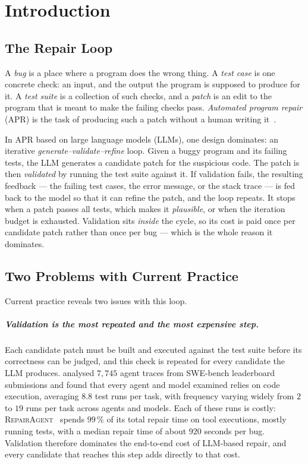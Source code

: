 \chapter{Introduction}
\label{ch:intro}

\section{The Repair Loop}
\label{sec:intro-loop}

A \emph{bug} is a place where a program does the wrong thing. A \emph{test case}
is one concrete check: an input, and the output the program is supposed to
produce for it. A \emph{test suite} is a collection of such checks, and a
\emph{patch} is an edit to the program that is meant to make the failing checks
pass. \emph{Automated program repair} (APR) is the task of producing such a
patch without a human writing it~\citep{legoues2019apr}.

In APR based on large language models (LLMs), one design dominates: an iterative
\emph{generate--validate--refine} loop. Given a buggy program and its failing
tests, the LLM generates a candidate patch for the suspicious code. The patch is
then \emph{validated} by running the test suite against it. If validation fails,
the resulting feedback --- the failing test cases, the error message, or the
stack trace --- is fed back to the model so that it can refine the patch, and
the loop repeats. It stops when a patch passes all tests, which makes it
\emph{plausible}, or when the iteration budget is exhausted. Validation sits
\emph{inside} the cycle, so its cost is paid once per candidate patch rather
than once per bug --- which is the whole reason it dominates.

\section{Two Problems with Current Practice}
\label{sec:intro-problems}

Current practice reveals two issues with this loop.

\paragraph{Validation is the most repeated and the most expensive step.}
Each candidate patch must be built and executed against the test suite before
its correctness can be judged, and this check is repeated for every candidate
the LLM produces. \citet{lin2026torun} analysed $7{,}745$ agent traces from
SWE-bench leaderboard submissions and found that every agent and model examined
relies on code execution, averaging $8.8$ test runs per task, with frequency
varying widely from $2$ to $19$ runs per task across agents and models. Each of
these runs is costly: \textsc{RepairAgent}~\citep{bouzenia2025repairagent}
spends $99\,\%$ of its total repair time on tool executions, mostly running
tests, with a median repair time of about $920$ seconds per bug. Validation
therefore dominates the end-to-end cost of LLM-based repair, and every candidate
that reaches this step adds directly to that cost.

